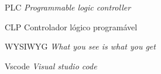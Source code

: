 \listoffigures*
\cleardoublepage

\listoftables*
\cleardoublepage

\listoflistings
\cleardoublepage

\begin{siglas}												%
    \item[PLC]               \textit{Programmable logic controller}
    \item[CLP]               Controlador lógico programável
    \item[WYSIWYG]           \textit{What you see is what you get}
    \item[Vscode]            \textit{Visual studio code}
\end{siglas}


\tableofcontents*
\cleardoublepage